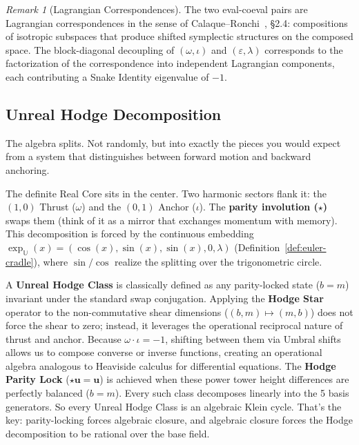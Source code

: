 \documentclass[12pt,oneside]{article}
\theoremstyle{principia}
\theoremstyle{definition}
\theoremstyle{remark}
\newtheorem{remark}[theorem]{Remark}
\providecommand{\UU}{\mathbb{U}}
\providecommand{\eps}{\varepsilon}
\providecommand{\lam}{\lambda}
\begin{document}
\begin{remark}[Lagrangian Correspondences]
The two eval-coeval pairs are Lagrangian correspondences in the sense of Calaque--Ronchi~\cite{calaque-ronchi}, \S2.4: compositions of isotropic subspaces that produce shifted symplectic structures on the composed space. The block-diagonal decoupling of $(\omega, \iota)$ and $(\eps, \lam)$ corresponds to the factorization of the correspondence into independent Lagrangian components, each contributing a Snake Identity eigenvalue of $-1$.
\end{remark}

\subsection{Unreal Hodge Decomposition}

The algebra splits. Not randomly, but into exactly the pieces you would expect from a system that distinguishes between forward motion and backward anchoring.

The definite Real Core sits in the center. Two harmonic sectors flank it: the $(1,0)$ Thrust ($\omega$) and the $(0,1)$ Anchor ($\iota$). The \textbf{parity involution ($\star$)} swaps them (think of it as a mirror that exchanges momentum with memory). This decomposition is forced by the continuous embedding $\exp_\UU(x) = (\cos(x), \sin(x), \sin(x), 0, \lam)$ (Definition~\ref{def:euler-cradle}), where $\sin/\cos$ realize the splitting over the trigonometric circle.

A \textbf{Unreal Hodge Class} is classically defined as any parity-locked state ($b = m$) invariant under the standard swap conjugation. Applying the \textbf{Hodge Star} operator to the non-commutative shear dimensions ($(b, m) \mapsto (m, b)$) does not force the shear to zero; instead, it leverages the operational reciprocal nature of thrust and anchor. Because $\omega \cdot \iota = -1$, shifting between them via Umbral shifts allows us to compose converse or inverse functions, creating an operational algebra analogous to Heaviside calculus for differential equations. The \textbf{Hodge Parity Lock} ($\star \mathbf{u} = \mathbf{u}$) is achieved when these power tower height differences are perfectly balanced ($b = m$). Every such class decomposes linearly into the 5 basis generators. So every Unreal Hodge Class is an algebraic Klein cycle. That's the key: parity-locking forces algebraic closure, and algebraic closure forces the Hodge decomposition to be rational over the base field.
\end{document}
